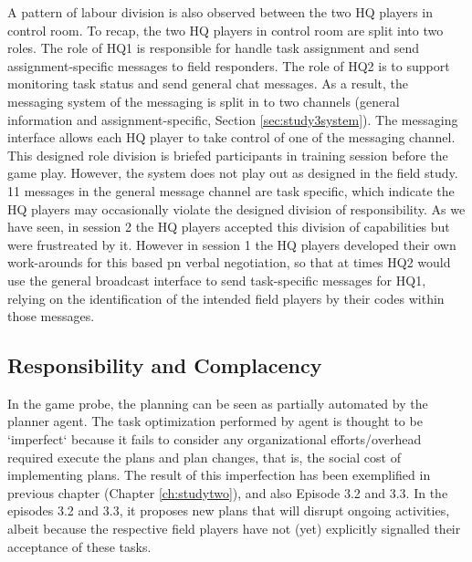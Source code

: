 A pattern of labour division is also observed between the two HQ players in control room. To recap, the two HQ players in control room are split into two roles. The role of HQ1 is responsible for handle task assignment and send assignment-specific messages to field responders. The role of HQ2 is to support monitoring task status and send general chat messages. As a result, the messaging system of the messaging is split in to two channels (general information and assignment-specific, Section \ref{sec:study3system}). The messaging interface allows each HQ player to take control of one of the messaging channel. This designed role division is briefed participants in training session before the game play. However, the system does not play out as designed in the field study. 11 messages in the general message channel are task specific, which indicate the HQ players may occasionally violate the designed division of responsibility. As we have seen, in session 2 the HQ players accepted this division of capabilities but were frustreated by it. However in session 1 the HQ players developed their own work-arounds for this based pn verbal negotiation, so that at times HQ2 would use the general broadcast interface to send task-specific messages for HQ1, relying on the identification of the intended field players by their codes within those messages.


\subsection{Responsibility and Complacency}\label{sec:huilimperfection}
In the game probe, the planning can be seen as partially automated by the planner agent. The task optimization performed by agent is thought to be `imperfect` because it fails to consider any organizational efforts/overhead required execute the plans and plan changes, that is, the social cost of implementing plans. The result of this imperfection has been exemplified in previous chapter (Chapter \ref{ch:studytwo}), and also Episode 3.2 and 3.3. In the episodes 3.2 and 3.3, it proposes new plans that will disrupt ongoing activities, albeit because the respective field players have not (yet) explicitly signalled their acceptance of these tasks.\\

